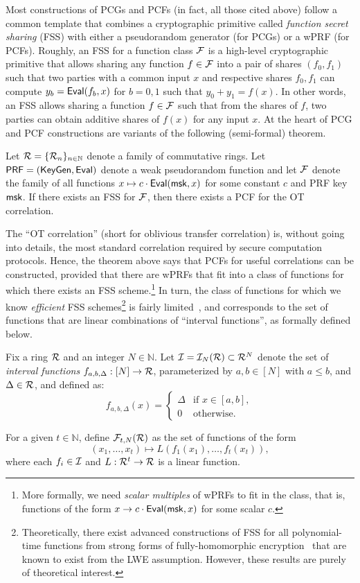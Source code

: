 Most constructions of PCGs and PCFs (in fact, all those cited above) follow a common template that combines a cryptographic primitive called \emph{function secret sharing} (FSS) with either a pseudorandom generator (for PCGs) or a wPRF (for PCFs). Roughly, an FSS for a function class $\mathcal{F}$ is a high-level cryptographic primitive that allows sharing any function $f\in \mathcal{F}$ into a pair of shares $(f_0, f_1)$ such that two parties with a common input $x$ and respective shares $f_0,f_1$ can compute $y_b = \mathsf{Eval}(f_b,x)$ for $b=0,1$ such that $y_0+y_1 = f(x)$. In other words, an FSS allows sharing a function $f\in\mathcal{F}$ such that from the shares of $f$, two parties can obtain additive shares of $f(x)$ for any input $x$. At the heart of PCG and PCF constructions are variants of the following (semi-formal) theorem.
\begin{theorem}
\label{thm:pcf-ot}
Let $\mathcal{R} = \{\mathcal{R}_n\}_{n\in \mathbb{N}}$ denote a family of commutative rings. Let $\mathsf{PRF}=(\mathsf{KeyGen},\mathsf{Eval})$ denote a weak pseudorandom function and let $\mathcal{F}$ denote the family of all functions $x\mapsto c\cdot\mathsf{Eval}(\mathsf{msk},x)$ for some constant $c$ and PRF key $\mathsf{msk}$. If there exists an FSS for $\mathcal{F}$, then there exists a PCF for the OT correlation.
\end{theorem}


The ``OT correlation'' (short for oblivious transfer correlation) is, without going into details, the most standard correlation required by secure computation protocols. Hence, the theorem above says that PCFs for useful correlations can be constructed, provided that there are wPRFs that fit into a class of functions for which there exists an FSS scheme.\footnote{More formally, we need \emph{scalar multiples} of wPRFs to fit in the class, that is, functions of the form $x\to c\cdot \mathsf{Eval}(\mathsf{msk},x)$ for some scalar $c$.} In turn, the class of functions for which we know \emph{efficient} FSS schemes\footnote{Theoretically, there exist advanced constructions of FSS for all polynomial-time functions from strong forms of fully-homomorphic encryption~\cite{C:DHRW16} that are known to exist from the LWE assumption. However, these results are purely of theoretical interest.} is fairly limited~\cite{CCS:BoyGilIsh16}, and corresponds to the set of functions that are linear combinations of ``interval functions'', as formally defined below.

\begin{definition}
Fix a ring $\mathcal{R}$ and an integer $N \in \mathbb{N}$. Let $\mathcal{I} = \mathcal{I}_N(\mathcal{R}) \subset \mathcal{R}^{N}$ denote the set of \emph{interval functions} $f_{a,b,\Delta} : [N] \to \mathcal{R}$, parameterized by $a,b \in [N]$ with $a \leq b$, and $\Delta \in \mathcal{R}$, and defined as:
\[
f_{a,b,\Delta}(x) = 
\begin{cases}
\Delta & \text{if } x \in [a,b], \\
0 & \text{otherwise}.
\end{cases}
\]

For a given $t \in \mathbb{N}$, define $\mathcal{F}_{t,N}(\mathcal{R})$ as the set of functions of the form
\[
(x_1, \dots, x_t) \mapsto L(f_1(x_1), \dots, f_t(x_t)),
\]
where each $f_i \in \mathcal{I}$ and $L : \mathcal{R}^t \to \mathcal{R}$ is a linear function.
\end{definition}


